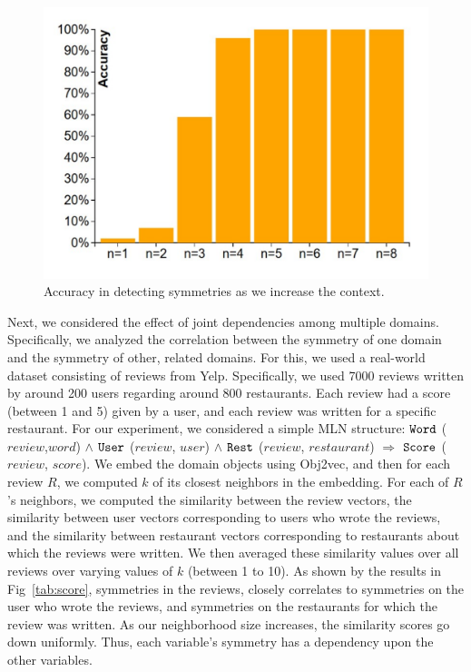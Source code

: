 \begin{figure}
  \centering
\includegraphics[scale=0.40]{symmetry.pdf}
\caption{\small{\label{fig:symmetry} Accuracy in detecting symmetries as we increase the context.}}
\end{figure} 

Next, we considered the effect of joint dependencies among multiple domains. Specifically, we analyzed the correlation between the symmetry of one domain and the symmetry of other, related domains. For this, we used a real-world dataset consisting of reviews from Yelp. Specifically, we used 7000 reviews written by around 200 users regarding around 800 restaurants.  Each review had a score (between 1 and 5) given by a user, and each review was written for a specific restaurant. For our experiment, we considered a simple MLN structure: ${\tt Word}$ ($review$,$word$) $\wedge$ ${\tt User}$ ($review$, $user$) $\wedge$ ${\tt Rest}$ ($review$, $restaurant$) $\Rightarrow$ ${\tt Score}$ ($review$, $score$). We embed the domain objects using Obj2vec, and then for each review $R$, we computed $k$ of its closest neighbors in the embedding. For each of $R$'s neighbors, we computed the similarity between the review vectors, the similarity between user vectors corresponding to users who wrote the reviews, and the similarity between restaurant vectors corresponding to restaurants about which the reviews were written. We then averaged these similarity values over all reviews over varying values of $k$ (between 1 to 10). As shown by the results in Fig~\ref{tab:score}, symmetries in the reviews, closely correlates to symmetries on the user who wrote the reviews, and symmetries on the restaurants for which the review was written. As our neighborhood size increases, the similarity scores go down uniformly. Thus, each variable's symmetry has a dependency upon the other variables.

